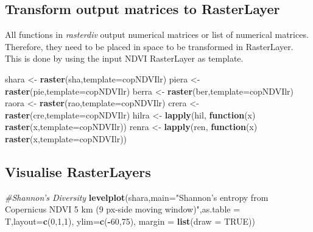 \documentclass[
]{article}
\newenvironment{Shaded}{\begin{snugshade}}{\end{snugshade}}
\newcommand{\CommentTok}[1]{\textcolor[rgb]{0.56,0.35,0.01}{\textit{#1}}}
\newcommand{\ControlFlowTok}[1]{\textcolor[rgb]{0.13,0.29,0.53}{\textbf{#1}}}
\newcommand{\DataTypeTok}[1]{\textcolor[rgb]{0.13,0.29,0.53}{#1}}
\newcommand{\DecValTok}[1]{\textcolor[rgb]{0.00,0.00,0.81}{#1}}
\newcommand{\KeywordTok}[1]{\textcolor[rgb]{0.13,0.29,0.53}{\textbf{#1}}}
\newcommand{\NormalTok}[1]{#1}
\newcommand{\OperatorTok}[1]{\textcolor[rgb]{0.81,0.36,0.00}{\textbf{#1}}}
\newcommand{\OtherTok}[1]{\textcolor[rgb]{0.56,0.35,0.01}{#1}}
\newcommand{\StringTok}[1]{\textcolor[rgb]{0.31,0.60,0.02}{#1}}
\begin{document}
\hypertarget{transform-output-matrices-to-rasterlayer}{%
\subsection{Transform output matrices to
RasterLayer}\label{transform-output-matrices-to-rasterlayer}}

All functions in \emph{rasterdiv} output numerical matrices or list of
numerical matrices. Therefore, they need to be placed in space to be
transformed in RasterLayer. This is done by using the input NDVI
RasterLayer as template.

\begin{Shaded}
\begin{Highlighting}[]
\NormalTok{shara <-}\StringTok{ }\KeywordTok{raster}\NormalTok{(sha,}\DataTypeTok{template=}\NormalTok{copNDVIlr)}
\NormalTok{piera <-}\StringTok{ }\KeywordTok{raster}\NormalTok{(pie,}\DataTypeTok{template=}\NormalTok{copNDVIlr)}
\NormalTok{berra <-}\StringTok{ }\KeywordTok{raster}\NormalTok{(ber,}\DataTypeTok{template=}\NormalTok{copNDVIlr)}
\NormalTok{raora <-}\StringTok{ }\KeywordTok{raster}\NormalTok{(rao,}\DataTypeTok{template=}\NormalTok{copNDVIlr)}
\NormalTok{crera <-}\StringTok{ }\KeywordTok{raster}\NormalTok{(cre,}\DataTypeTok{template=}\NormalTok{copNDVIlr)}
\NormalTok{hilra <-}\StringTok{ }\KeywordTok{lapply}\NormalTok{(hil, }\ControlFlowTok{function}\NormalTok{(x) }\KeywordTok{raster}\NormalTok{(x,}\DataTypeTok{template=}\NormalTok{copNDVIlr))}
\NormalTok{renra <-}\StringTok{ }\KeywordTok{lapply}\NormalTok{(ren, }\ControlFlowTok{function}\NormalTok{(x) }\KeywordTok{raster}\NormalTok{(x,}\DataTypeTok{template=}\NormalTok{copNDVIlr))}
\end{Highlighting}
\end{Shaded}

\hypertarget{visualise-rasterlayers}{%
\subsection{Visualise RasterLayers}\label{visualise-rasterlayers}}

\begin{Shaded}
\begin{Highlighting}[]
\CommentTok{#Shannon's Diversity}
\KeywordTok{levelplot}\NormalTok{(shara,}\DataTypeTok{main=}\StringTok{"Shannon's entropy from Copernicus NDVI 5 km (9 px-side moving window)"}\NormalTok{,}\DataTypeTok{as.table =}\NormalTok{ T,}\DataTypeTok{layout=}\KeywordTok{c}\NormalTok{(}\DecValTok{0}\NormalTok{,}\DecValTok{1}\NormalTok{,}\DecValTok{1}\NormalTok{), }\DataTypeTok{ylim=}\KeywordTok{c}\NormalTok{(}\OperatorTok{-}\DecValTok{60}\NormalTok{,}\DecValTok{75}\NormalTok{), }\DataTypeTok{margin =} \KeywordTok{list}\NormalTok{(}\DataTypeTok{draw =} \OtherTok{TRUE}\NormalTok{))}
\end{Highlighting}
\end{Shaded}
\end{document}
